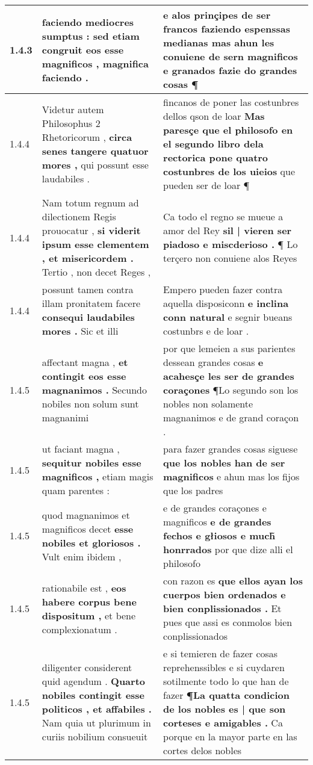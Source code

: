 \begin{tabular}{|p{1cm}|p{6.5cm}|p{6.5cm}|}
1.4.3 & faciendo mediocres sumptus : \textbf{ sed etiam congruit eos esse magnificos , } magnifica faciendo . & e alos prinçipes de ser francos faziendo espenssas medianas \textbf{ mas ahun les conuiene de sern magnificos } e granados fazie do grandes cosas ¶ \\\hline
1.4.4 & Videtur autem Philosophus 2 Rhetoricorum , \textbf{ circa senes tangere quatuor mores , } qui possunt esse laudabiles . & fincanos de poner las costunbres dellos qson de loar \textbf{ Mas paresçe que el philosofo en el segundo libro dela rectorica pone quatro costunbres de los uieios } que pueden ser de loar ¶ \\\hline
1.4.4 & Nam totum regnum ad dilectionem Regis prouocatur , \textbf{ si viderit ipsum esse clementem , et misericordem . } Tertio , non decet Reges , & Ca todo el regno se mueue a amor del Rey \textbf{ sil | vieren ser piadoso e miscderioso . } ¶ Lo terçero non conuiene alos Reyes \\\hline
1.4.4 & possunt tamen contra illam pronitatem facere \textbf{ consequi laudabiles mores . } Sic et illi & Empero pueden fazer contra aquella disposiconn \textbf{ e inclina conn natural } e segnir bueans costunbrs e de loar . \\\hline
1.4.5 & affectant magna , \textbf{ et contingit eos esse magnanimos . } Secundo nobiles non solum sunt magnanimi & por que lemeien a sus parientes dessean grandes cosas \textbf{ e acahesçe les ser de grandes coraçones } ¶Lo segundo son los nobles non solamente magnanimos e de grand coraçon . \\\hline
1.4.5 & ut faciant magna , \textbf{ sequitur nobiles esse magnificos , } etiam magis quam parentes : & para fazer grandes cosas siguese \textbf{ que los nobles han de ser magnificos } e ahun mas los fijos que los padres \\\hline
1.4.5 & quod magnanimos et magnificos decet \textbf{ esse nobiles et gloriosos . } Vult enim ibidem , & e de grandes coraçones e magnificos \textbf{ e de grandes fechos e głiosos e much̃ honrrados } por que dize alli el philosofo \\\hline
1.4.5 & rationabile est , \textbf{ eos habere corpus bene dispositum , } et bene complexionatum . & con razon es \textbf{ que ellos ayan los cuerpos bien ordenados e bien conplissionados . } Et pues que assi es conmolos bien conplissionados \\\hline
1.4.5 & diligenter considerent quid agendum . \textbf{ Quarto nobiles contingit esse politicos , et affabiles . } Nam quia ut plurimum in curiis nobilium consueuit & e si temieren de fazer cosas reprehenssibles e si cuydaren sotilmente todo lo que han de fazer \textbf{ ¶La quatta condicion de los nobles es | que son corteses e amigables . } Ca porque en la mayor parte en las cortes delos nobles \\\hline

\end{tabular}
